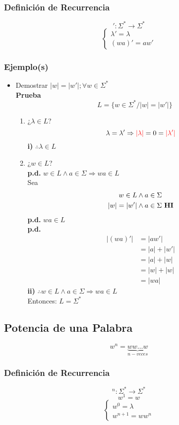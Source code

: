 \subsubsection*{Definición de Recurrencia}
$$':\Sigma^*\rightarrow\Sigma^*$$
$$
\begin{cases}
\lambda'=\lambda \\
(wa)' = aw'
\end{cases}
$$
\subsubsection{Ejemplo(s)}
\begin{itemize}
\item Demostrar $|w| = |w'| ; \forall w\in\Sigma^*$ \\
\textbf{Prueba}
$$ L = \{ w\in\Sigma^* / |w|=|w'| \} $$
\begin{enumerate}[label=\alph*)]
\item ¿$\lambda \in L$?
$$\lambda = \lambda' \Rightarrow {\color{red}|\lambda |} = 0 = {\color{red}| \lambda' |}$$
\textbf{i)} $\therefore \lambda\in L$
\item ¿$w \in L$? \\${ }$\\
\textbf{p.d.} $w\in L \wedge a\in\Sigma\Rightarrow wa\in L$\\
Sea 
\begin{align*}
w \in L & \wedge a\in\Sigma \\
|w| = |w'| & \wedge a\in\Sigma \text{ \textbf{HI}}
\end{align*}
\textbf{p.d.} $wa\in L$ \\
\textbf{p.d.} 
\begin{align*}
| (wa)' | & = | aw' | \\
	    & = |a| + |w'| \\
	    & = |a|+|w| \\
	    & = |w| + |w| \\
	    & = | wa|
\end{align*}
\textbf{ii)} $\therefore w\in L \wedge a \in\Sigma \Rightarrow wa\in L$ \\${ }$\\
Entonces: $L=\Sigma^*$
\end{enumerate}
\end{itemize}
\subsection{Potencia de una Palabra}
$$w^n =  \underbrace{ww\ldots w}_{n-veces}$$
\subsubsection*{Definición de Recurrencia}
$$^n:\Sigma^*\rightarrow\Sigma^*$$
$$ w^1 = w $$
$$
\begin{cases}
w^0=\lambda \\
w^{n+1} = ww^{n}
\end{cases}
$$
